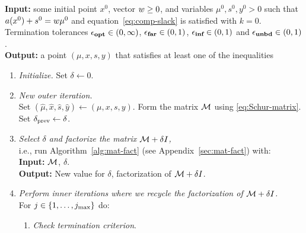\documentclass{article}
\begin{document}
\begin{algorithm}[H]
\textbf{Input:} some initial point $x^{0}$, vector $w \ge 0$, and variables $\mu^0, s^{0}, y^{0} > 0$  such that $a(x^{0}) + s^{0} = w \mu^{0}$ and equation~\eqref{eq:comp-slack}   is satisfied with $k=0$. Termination tolerances $\epsilon_{\textbf{opt}} \in (0,\infty)$, $\epsilon_{\textbf{far}} \in (0,1)$, $\epsilon_{\textbf{inf}} \in (0,1)$ and $\epsilon_{\textbf{unbd}} \in (0,1)$. \\
\textbf{Output:} a point $(\mu, x, s, y)$ that satisfies at least one of the inequalities \termination{}
\vspace{0.1 cm} %
\begin{enumerate}[label*=A.{\arabic*}]
\item \label{line:init-delta} \emph{Initialize.} Set $\delta \gets 0$.
\item \label{line:form-K}  \emph{New outer iteration.} \\
Set $(\hat{\mu}, \hat{x}, \hat{s}, \hat{y}) \gets (\mu, x, s, y)$. Form the matrix $\mathcal{M}$ using \eqref{eq:Schur-matrix}. Set $\delta_{\text{prev}} \gets \delta$.
\item \label{line:factor-schur} \emph{Select $\delta$ and factorize the matrix $\mathcal{M} + \delta I$,} \\
i.e., run Algorithm~\ref{alg:mat-fact} (see Appendix~\ref{sec:mat-fact}) with: \\
\hspace*{0.1cm}  \textbf{Input:} $\mathcal{M}$, $\delta$. \\
\hspace*{0.1cm} \textbf{Output:} New value for $\delta$, factorization of $\mathcal{M} + \delta I$.
\item \label{take-steps}  \emph{Perform inner iterations where we recycle the factorization of $\mathcal{M} + \delta I$.} \\
For $j \in \{ 1, \dots , j_{\max} \}$ do:
\begin{enumerate}[label*=.{\arabic*}]
\item \emph{Check termination criterion}. \\

\end{enumerate}
\end{enumerate}
\end{algorithm}
\end{document}
